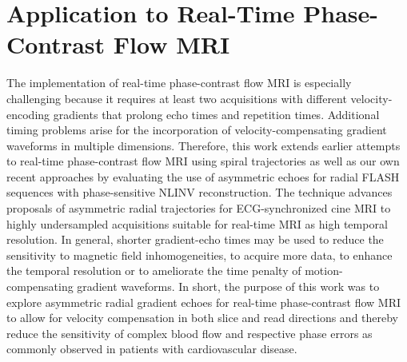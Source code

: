 \section{Application to Real-Time Phase-Contrast Flow MRI}
The implementation of real-time phase-contrast flow MRI is especially challenging because it requires at least two acquisitions with different velocity-encoding gradients that prolong echo times and repetition times. Additional timing problems arise for the incorporation of velocity-compensating gradient waveforms in multiple dimensions. Therefore, this work extends earlier attempts to real-time phase-contrast flow MRI using spiral trajectories \cite{2000_color_flow_MRM,2008_color_flow_MRI} as well as our own recent approaches \cite{2012_PC_Joseph,2014_PC_Joseph} by evaluating the use of asymmetric echoes for radial FLASH sequences with phase-sensitive NLINV reconstruction. The technique advances proposals of asymmetric radial trajectories for ECG-synchronized cine MRI \cite{2014_asym-echo_ISMRM,2014_sTE_flow_ISMRM} to highly undersampled acquisitions suitable for real-time MRI as high temporal resolution. In general, shorter gradient-echo times may be used to reduce the sensitivity to magnetic field inhomogeneities, to acquire more data, to enhance the temporal resolution or to ameliorate the time penalty of motion-compensating gradient waveforms. In short, the purpose of this work was to explore asymmetric radial gradient echoes for real-time phase-contrast flow MRI to allow for velocity compensation in both slice and read directions and thereby reduce the sensitivity of complex blood flow and respective phase errors as commonly observed in patients with cardiovascular disease.

